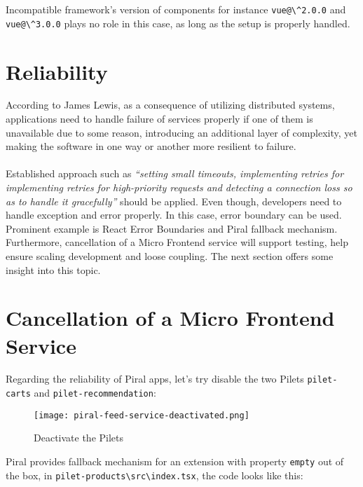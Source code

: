 \documentclass[a4paper]{book}
\begin{document}
Incompatible framework's version of components for instance \verb|vue@\^2.0.0| and \verb|vue@\^3.0.0| plays no role in this case, as long as the setup is properly handled.

\section{Reliability}
According to James Lewis, as a consequence of utilizing distributed systems, applications need to handle failure of services properly if one of them is unavailable due to some reason, introducing an additional layer of complexity, yet making the software in one way or another more resilient to failure. \cite{Lew14}
\\ \\
Established approach such as \textit{“setting small timeouts, implementing retries for implementing retries for high-priority requests and detecting a connection loss so as to handle it gracefully”} \cite{Rap20} should be applied. Even though, developers need to handle exception and error properly. In this case, error boundary can be used. Prominent example is React Error Boundaries \cite{ReactErrorBundaries} and Piral fallback mechanism. Furthermore, cancellation of a Micro Frontend service will support testing, help ensure scaling development and loose coupling. The next section offers some insight into this topic.

\section{Cancellation of a Micro Frontend Service}
Regarding the reliability of Piral apps, let's try disable the two Pilets \verb|pilet-carts| and \verb|pilet-recommendation|:
\begin{figure}[h!]
  \centering
  \captionsetup{justification=centering}
  \texttt{[image: piral-feed-service-deactivated.png]}
  \caption{Deactivate the Pilets}
  \label{fig:piral-feed-service-deactivated}
\end{figure}

Piral provides fallback mechanism for an extension with property \verb|empty| out of the box, in \verb|pilet-products\src\index.tsx|, the code looks like this:
\end{document}
